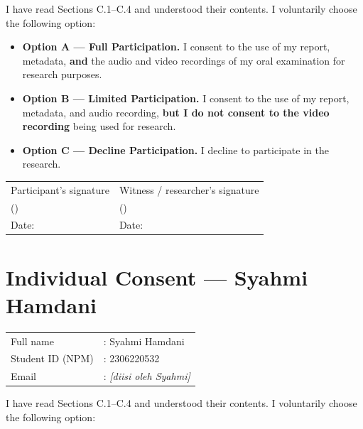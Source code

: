 \documentclass[11pt,a4paper,oneside]{report}
\begin{document}
I have read Sections C.1--C.4 and understood their contents. I voluntarily choose the following option:

\vspace{0.5em}

\begin{itemize}[leftmargin=2em, label={$\square$}, itemsep=0.8em]
    \item \textbf{Option A --- Full Participation.} I consent to the use of my report, metadata, \textbf{and} the audio and video recordings of my oral examination for research purposes.
    \item \textbf{Option B --- Limited Participation.} I consent to the use of my report, metadata, and audio recording, \textbf{but I do not consent to the video recording} being used for research.
    \item \textbf{Option C --- Decline Participation.} I decline to participate in the research.
\end{itemize}

\vfill

\noindent
\begin{tabular}{p{}p{}}
\centering Participant's signature & \centering Witness / researcher's signature \tabularnewline[2.5cm]
\centering (\hspace{4cm}) & \centering (\hspace{4cm}) \tabularnewline
\centering Date: \hspace{3cm} & \centering Date: \hspace{3cm} \tabularnewline
\end{tabular}

\newpage
\section*{Individual Consent --- Syahmi Hamdani}

\noindent
\begin{tabular}{p{}p{}}
Full name        & : Syahmi Hamdani \\
Student ID (NPM) & : 2306220532 \\
Email            & : \textit{[diisi oleh Syahmi]} \\
\end{tabular}

\vspace{1.5em}

I have read Sections C.1--C.4 and understood their contents. I voluntarily choose the following option:
\end{document}

